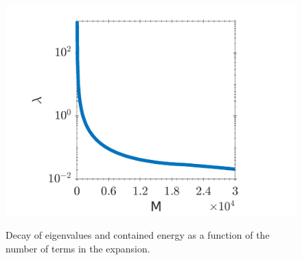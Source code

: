 \begin{figure}[H]
{ \includegraphics[scale=0.485]{./figuras/exp_autoval_100x100x1_0-2x0-2_30000.png}}
 \caption{Decay of eigenvalues and contained energy as a function of the number of terms in the expansion.}
 \label{eigenvalues}
\end{figure}



